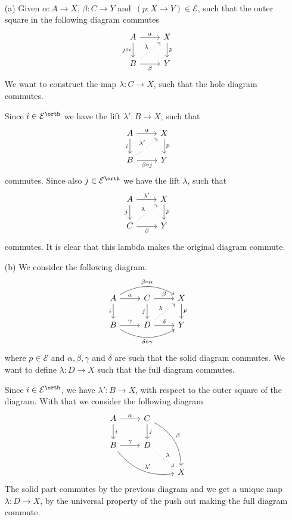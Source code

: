 
\def\Eps{\mathcal{E}}


\mmaketitle

\begin{exercise}[1]\ 

\begin{enumerate}
\item[(a)] 
Given $\alpha: A \to X$, $\beta : C \to Y$ and $(p : X\to Y) \in \Eps$, such
that the outer square in the following diagram commutes
\[ \begin{tikzcd}
A \ar[r,"\alpha"] \ar[d, "j \circ i"'] 
& X \ar[d, "p"] \\
B \ar[r, "\beta"'] \ar[ru, dotted, "\lambda"]
& Y
\end{tikzcd} \]
We want to construct the map $\lambda: C \to X$, such that the hole diagram
commutes.

Since $i \in \Eps^\orth$ we have the lift $\lambda' : B \to X$, such that 
\[ \begin{tikzcd}
A \ar[r,"\alpha"] \ar[d, "i"'] 
& X \ar[d, "p"] \\
B \ar[r, "\beta \circ j"'] \ar[ru, dotted, "\lambda'"]
& Y
\end{tikzcd} \]
commutes. Since also $j\in \Eps^\orth$ we have the lift $\lambda$, such that 
\[ \begin{tikzcd}
A \ar[r,"\lambda'"] \ar[d, "j"'] 
& X \ar[d, "p"] \\
C \ar[r, "\beta"'] \ar[ru, dotted, "\lambda"]
& Y
\end{tikzcd} \]
commutes. It is clear that this lambda makes the original diagram commute.

\item[(b)]
We consider the following diagram.
\[ \begin{tikzcd}
A \ar[r, "\alpha"] \ar[rr, bend left, "\beta \circ \alpha"] 
\ar[d, "i"'] 
& C \ar[r, "\beta"] \ar[d, "j"'] 
& X \ar[d, "p"]
\\ 
B \ar[r, "\gamma"] \ar[rr, bend right, "\delta \circ \gamma"'] 
& D \ar[r, "\delta"] 
\ar[ru, dotted, "\lambda"]
& Y
\end{tikzcd} \]
where $p\in \Eps$ and $\alpha, \beta, \gamma$ and $\delta$ are such that
the solid diagram commutes. 
We want to define $\lambda : D \to X$ such that the
full diagram commutes.

Since $i \in \Eps^\orth$, we have $\lambda' : B \to X$, with respect to the
outer square of the diagram. With that we consider the following diagram
\[ \begin{tikzcd}
A \ar[r,"\alpha"] \ar[d, "i"] 
& C \ar[d, "j"] \ar[rdd, bend left, "\beta"] 
& \\
B \ar[r, "\gamma"] \ar[rrd, bend right, "\lambda'"] 
& D \ar[rd, dotted, "\lambda"]
& \\ 
& & X
\end{tikzcd} \]
The solid part commutes by the previous diagram and we get a unique map 
$\lambda : D \to X$, by the universal property of the push out making the full
diagram commute.


\end{enumerate}
\end{exercise}

